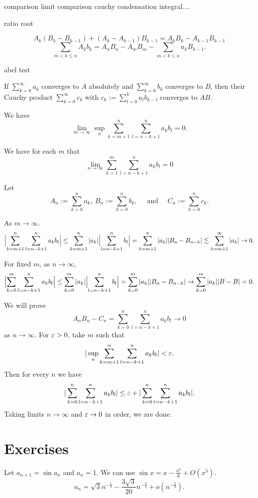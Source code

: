 \documentclass{../../large}
\begin{document}
comparison
limit comparison
cauchy condensation
integral....

ratio
root


\begin{prb}
\[A_k(B_k-B_{k-1})+(A_k-A_{k-1})B_{k-1}=A_kB_k-A_{k-1}B_{k-1}\]
\[\sum_{m<k\le n}A_kb_k=A_nB_n-A_mB_m-\sum_{m<k\le n}a_kB_{k-1}.\]
\end{prb}

abel test
\begin{prb}
\end{prb}


\begin{prb}
If $\sum_{k=0}^\infty a_k$ converges to $A$ absolutely and $\sum_{k=0}^\infty b_k$ converges to $B$, then their Cauchy product $\sum_{k=0}^\infty c_k$ with $c_k:=\sum_{l=0}^ka_lb_{k-l}$ converges to $AB$.
\begin{parts}
\item We have
\[\lim_{m\to\infty}\sup_n\sum_{k=m+1}^n\sum_{l=n-k+1}^na_kb_l=0.\]
\item We have for each $m$ that
\[\lim_{n\to\infty}\sum_{k=1}^m\sum_{l=n-k+1}^na_kb_l=0\]
\end{parts}
\end{prb}
\begin{pf}
Let
\[A_n:=\sum_{k=0}^na_k,\ B_n:=\sum_{k=0}^nb_k,\quad\text{ and }\quad C_n:=\sum_{k=0}^nc_k.\]


As $m\to\infty$.
\[\Bigl|\sum_{k=m+1}^n\sum_{l=n-k+1}^na_kb_l\Bigr|\le\sum_{k=m+1}^n|a_k|\Bigl|\sum_{l=n-k+1}^nb_l\Bigr|=\sum_{k=m+1}^n|a_k||B_n-B_{n-k}|\lesssim\sum_{k=m+1}^\infty|a_k|\to0.\]

For fixed $m$, as $n\to\infty$,
\[\Bigl|\sum_{k=0}^m\sum_{l=n-k+1}^na_kb_l\Bigr|\le\sum_{k=0}^m|a_k|\Bigl|\sum_{l=n-k+1}^nb_l\Bigr|=\sum_{k=0}^m|a_k||B_n-B_{n-k}|\to\sum_{k=0}^m|a_k||B-B|=0.\]

We will prove
\[A_nB_n-C_n=\sum_{k=0}^n\sum_{l=n-k+1}^na_kb_l\to0\]
as $n\to\infty$.
For $\varepsilon>0$, take $m$ such that
\[|\sup_n\sum_{k=m+1}^n\sum_{l=n-k+1}^na_kb_l|<\varepsilon.\]
Then for every $n$ we have
\[|\sum_{k=0}^n\sum_{l=n-k+1}^na_kb_l|\le\varepsilon+|\sum_{k=0}^n\sum_{l=n-k+1}^na_kb_l|.\]
Taking limits $n\to\infty$ and $\varepsilon\to0$ in order, we are done.
\end{pf}




\section*{Exercises}
\begin{prb}

\end{prb}
\begin{prb}
Let $a_{n+1}=\sin a_n$ and $a_n=1$.
We can use $\sin x=x-\frac{x^3}6+O(x^5)$.
\[a_n=\sqrt3n^{-\frac12}-\frac{3\sqrt3}{20}n^{-\frac32}+o(n^{-\frac32}).\]
\end{prb}
\end{document}
